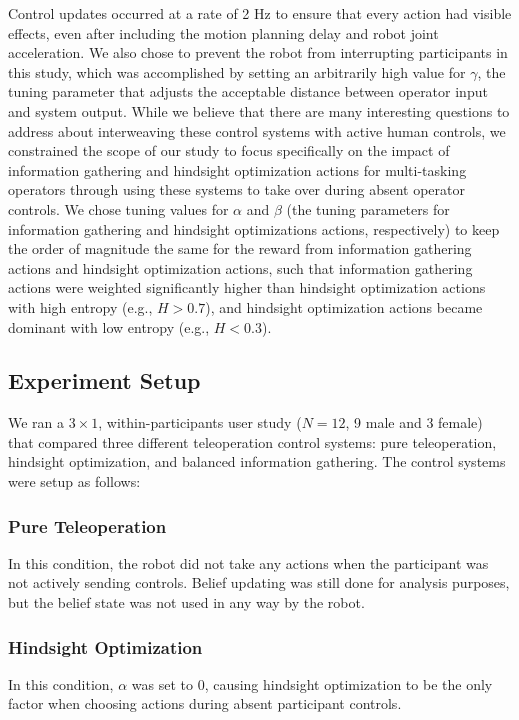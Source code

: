 \documentclass[conference]{IEEEtran}
\begin{document}
Control updates occurred at a rate of 2 Hz to ensure that every action had visible effects, even after including the motion planning delay and robot joint acceleration. We also chose to prevent the robot from interrupting participants in this study, which was accomplished by setting an arbitrarily high value for $\gamma$, the tuning parameter that adjusts the acceptable distance between operator input and system output. While we believe that there are many interesting questions to address about interweaving these control systems with active human controls, we constrained the scope of our study to focus specifically on the impact of information gathering and hindsight optimization actions for multi-tasking operators through using these systems to take over during absent operator controls. We chose tuning values for $\alpha$ and $\beta$ (the tuning parameters for information gathering and hindsight optimizations actions, respectively) to keep the order of magnitude the same for the reward from information gathering actions and hindsight optimization actions, such that information gathering actions were weighted significantly higher than hindsight optimization actions with high entropy (e.g., $H > 0.7$), and hindsight optimization actions became dominant with low entropy (e.g., $H < 0.3$).

\subsection{Experiment Setup}

We ran a $3 \times 1$, within-participants user study ($N = 12$, 9 male and 3 female) that compared three different teleoperation control systems: pure teleoperation, hindsight optimization, and balanced information gathering. The control systems were setup as follows:

\subsubsection{Pure Teleoperation}
In this condition, the robot did not take any actions when the participant was not actively sending controls. Belief updating was still done for analysis purposes, but the belief state was not used in any way by the robot.
\subsubsection{Hindsight Optimization}
In this condition, $\alpha$ was set to 0, causing hindsight optimization to be the only factor when choosing actions during absent participant controls.
\end{document}
